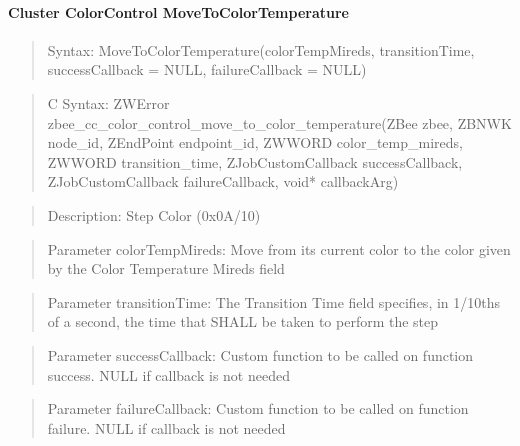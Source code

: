 \paragraph{Cluster ColorControl MoveToColorTemperature}
\begin{quote}Syntax: MoveToColorTemperature(colorTempMireds, transitionTime, successCallback = NULL, failureCallback = NULL)\end{quote}
\begin{quote}C Syntax: ZWError zbee\_cc\_color\_control\_move\_to\_color\_temperature(ZBee zbee, ZBNWK node\_id, ZEndPoint endpoint\_id, ZWWORD color\_temp\_mireds, ZWWORD transition\_time, ZJobCustomCallback successCallback, ZJobCustomCallback failureCallback, void* callbackArg)\end{quote}
\begin{quote}Description: Step Color (0x0A/10)\end{quote}
\begin{quote}Parameter colorTempMireds: Move from its current color to the color given by the Color Temperature Mireds field\end{quote}
\begin{quote}Parameter transitionTime: The Transition Time field specifies, in 1/10ths of a second, the time that SHALL be taken to perform the step\end{quote}
\begin{quote}Parameter successCallback: Custom function to be called on function success. NULL if callback is not needed\end{quote}
\begin{quote}Parameter failureCallback: Custom function to be called on function failure. NULL if callback is not needed\end{quote}


